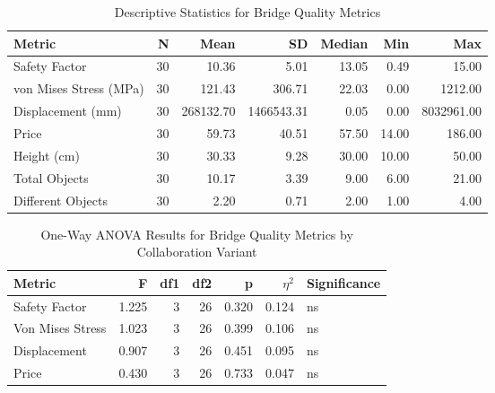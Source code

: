 
\begin{table}[htbp]
\centering
\caption{Descriptive Statistics for Bridge Quality Metrics}
\label{tab:bridge_quality_overall}
\begin{tabular}{lrrrrrr}
\toprule
Metric & N & Mean & SD & Median & Min & Max \\
\midrule
Safety Factor & 30 & 10.36 & 5.01 & 13.05 & 0.49 & 15.00 \\
von Mises Stress (MPa) & 30 & 121.43 & 306.71 & 22.03 & 0.00 & 1212.00 \\
Displacement (mm) & 30 & 268132.70 & 1466543.31 & 0.05 & 0.00 & 8032961.00 \\
Price & 30 & 59.73 & 40.51 & 57.50 & 14.00 & 186.00 \\
Height (cm) & 30 & 30.33 & 9.28 & 30.00 & 10.00 & 50.00 \\
Total Objects & 30 & 10.17 & 3.39 & 9.00 & 6.00 & 21.00 \\
Different Objects & 30 & 2.20 & 0.71 & 2.00 & 1.00 & 4.00 \\
\bottomrule
\end{tabular}
\end{table}

\begin{table}[htbp]
\centering
\caption{One-Way ANOVA Results for Bridge Quality Metrics by Collaboration Variant}
\label{tab:anova_bridge_quality}
\begin{tabular}{lrrrrrl}
\toprule
Metric & F & df1 & df2 & p & $\eta^2$ & Significance \\
\midrule
Safety Factor & 1.225 & 3 & 26 & 0.320 & 0.124 & ns \\
Von Mises Stress & 1.023 & 3 & 26 & 0.399 & 0.106 & ns \\
Displacement & 0.907 & 3 & 26 & 0.451 & 0.095 & ns \\
Price & 0.430 & 3 & 26 & 0.733 & 0.047 & ns \\
\bottomrule
\end{tabular}
\end{table}

